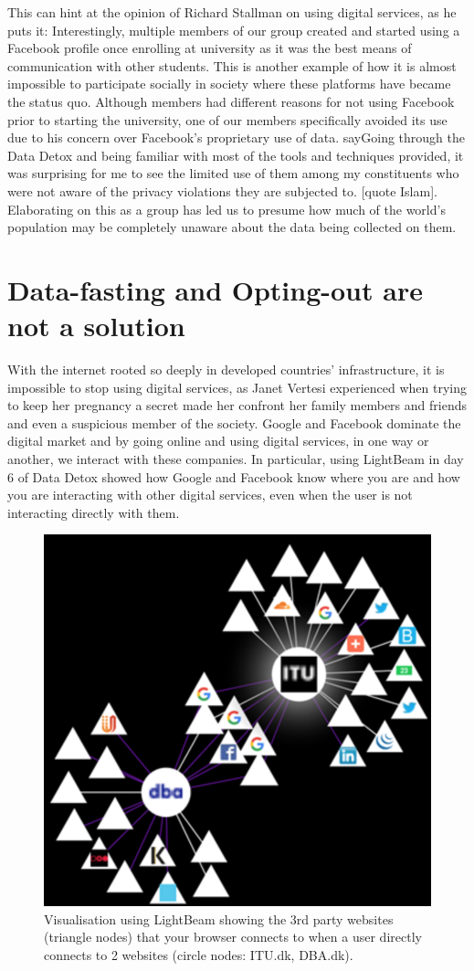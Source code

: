 \documentclass[format=acmsmall, review=false, screen=true]{acmart}
\begin{document}
This can hint at the opinion of Richard Stallman on using digital services, as he puts it: 
Interestingly, multiple members of our group created and started using a Facebook profile once enrolling at university as it was the best means of communication with other students. This is another example of how it is almost impossible to participate socially in society where these platforms have became the status quo. Although members had different reasons for not using Facebook prior to starting the university, one of our members specifically avoided its use due to his concern over Facebook's proprietary use of data. say{Going through the Data Detox and being familiar with most of the tools and techniques provided, it was surprising for me to see the limited use of them among my constituents who were not aware of the privacy violations they are subjected to.} [quote Islam]. Elaborating on this as a group has led us to presume how much of the world's population may be completely unaware about the data being collected on them.


\section{Data-fasting and Opting-out are not a solution}

With the internet rooted so deeply in developed countries’ infrastructure, it is impossible to stop using digital services, as Janet Vertesi experienced when trying to keep her pregnancy a secret made her confront her family members and friends and even a suspicious member of the society. Google and Facebook dominate the digital market and by going online and using digital services, in one way or another, we interact with these companies. In particular, using LightBeam in day 6 of Data Detox showed how Google and Facebook know where you are and how you are interacting with other digital services, even when the user is not interacting directly with them.

\begin{figure}[H]
  \includegraphics[width=0.46\linewidth]{lighbeam.PNG}
  \caption{Visualisation using LightBeam showing the 3rd party websites (triangle nodes) that your browser connects to when a user directly connects to 2 websites (circle nodes: ITU.dk, DBA.dk).}
  \label{fig:main-diagram}
\end{figure}
\end{document}
